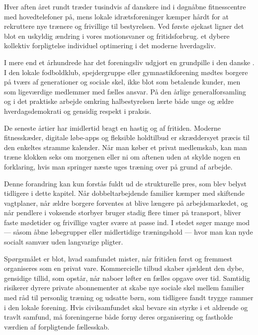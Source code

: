 Hver aften året rundt træder tusindvis af danskere ind i døgnåbne fitnesscentre med hovedtelefoner på, mens lokale idrætsforeninger kæmper hårdt for at rekruttere nye trænere og frivillige til bestyrelsen. Ved første øjekast ligner det blot en uskyldig ændring i vores motionsvaner og fritidsforbrug.   et dybere  kollektiv forpligtelse  individuel optimering i det moderne hverdagsliv.

I mere end et århundrede har det  foreningsliv udgjort en grundpille i den danske . I den lokale fodboldklub, spejdergruppe eller gymnastikforening mødtes borgere på tværs af generationer og sociale skel, ikke blot som betalende kunder, men som ligeværdige medlemmer med fælles ansvar. På den årlige generalforsamling og i det praktiske arbejde omkring halbestyrelsen lærte både unge og ældre hverdagsdemokrati og gensidig respekt i praksis.

De seneste årtier har imidlertid bragt en hastig  og  af fritiden. Moderne fitnesskæder, digitale løbe-apps og fleksible holdtilbud er skræddersyet præcis til den enkeltes stramme kalender. Når man køber et privat medlemskab, kan man træne klokken seks om morgenen eller ni om aftenen uden at skylde nogen en forklaring, hvis man springer næste uges træning over på grund af arbejde.

Denne forandring kan kun forstås fuldt ud  de strukturelle pres, som blev belyst tidligere i dette kapitel. Når dobbeltarbejdende familier kæmper med skiftende vagtplaner, når ældre borgere forventes at blive længere på arbejdsmarkedet, og når pendlere i voksende storbyer bruger stadig flere timer på transport, bliver faste mødetider og frivillige vagter svære at passe ind. I stedet søger mange mod  --- såsom åbne løbegrupper eller midlertidige træningshold --- hvor man kan nyde socialt samvær uden langvarige pligter.

Spørgsmålet er blot, hvad samfundet mister, når fritiden først og fremmest organiseres som en privat vare. Kommercielle tilbud skaber sjældent den dybe, gensidige tillid, som opstår, når naboer løfter en fælles opgave over tid. Samtidig risikerer dyrere private abonnementer at skabe nye sociale skel mellem familier med råd til personlig træning og udsatte børn, som tidligere fandt trygge rammer i den lokale forening. Hvis civilsamfundet skal bevare sin styrke i et aldrende og travlt samfund, må foreningerne både forny deres organisering og fastholde værdien af forpligtende fællesskab.

